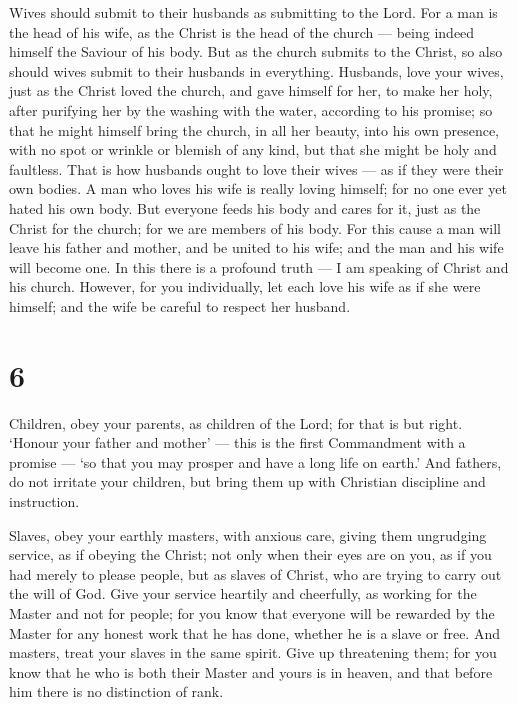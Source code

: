  Wives should submit to their husbands as submitting to the
Lord.  For a man is the head of his wife, as the Christ is
the head of the church --- being indeed himself the Saviour of his body.
 But as the church submits to the Christ, so also should
wives submit to their husbands in everything.  Husbands,
love your wives, just as the Christ loved the church, and gave himself
for her,  to make her holy, after purifying her by the
washing with the water, according to his promise;  so that
he might himself bring the church, in all her beauty, into his own
presence, with no spot or wrinkle or blemish of any kind, but that she
might be holy and faultless.  That is how husbands ought to
love their wives --- as if they were their own bodies. A man who loves
his wife is really loving himself;  for no one ever yet
hated his own body. But everyone feeds his body and cares for it, just
as the Christ for the church;  for we are members of his
body.  For this cause a man will leave his father and
mother, and be united to his wife; and the man and his wife will become
one.  In this there is a profound truth --- I am speaking
of Christ and his church.  However, for you individually,
let each love his wife as if she were himself; and the wife be careful
to respect her husband.

\hypertarget{section-5}{%
\section{6}\label{section-5}}

 Children, obey your parents, as children of the Lord; for
that is but right.  `Honour your father and mother' --- this
is the first Commandment with a promise ---  `so that you
may prosper and have a long life on earth.'  And fathers, do
not irritate your children, but bring them up with Christian discipline
and instruction.

 Slaves, obey your earthly masters, with anxious care,
giving them ungrudging service, as if obeying the Christ; 
not only when their eyes are on you, as if you had merely to please
people, but as slaves of Christ, who are trying to carry out the will of
God.  Give your service heartily and cheerfully, as working
for the Master and not for people;  for you know that
everyone will be rewarded by the Master for any honest work that he has
done, whether he is a slave or free.  And masters, treat
your slaves in the same spirit. Give up threatening them; for you know
that he who is both their Master and yours is in heaven, and that before
him there is no distinction of rank.

